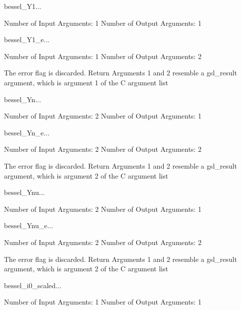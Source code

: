 \begin{funcdesc}{bessel_Y1}{...}

    Number of Input  Arguments:  1
    Number of Output Arguments:  1
\end{funcdesc}

\begin{funcdesc}{bessel_Y1_e}{...}

    Number of Input  Arguments:  1
    Number of Output Arguments:  2

The error flag is discarded.
Return Arguments 1 and 2 resemble a gsl_result argument,
	which is  argument 1 of the C argument list

\end{funcdesc}

\begin{funcdesc}{bessel_Yn}{...}

    Number of Input  Arguments:  2
    Number of Output Arguments:  1
\end{funcdesc}

\begin{funcdesc}{bessel_Yn_e}{...}

    Number of Input  Arguments:  2
    Number of Output Arguments:  2

The error flag is discarded.
Return Arguments 1 and 2 resemble a gsl_result argument,
	which is  argument 2 of the C argument list

\end{funcdesc}

\begin{funcdesc}{bessel_Ynu}{...}

    Number of Input  Arguments:  2
    Number of Output Arguments:  1
\end{funcdesc}

\begin{funcdesc}{bessel_Ynu_e}{...}

    Number of Input  Arguments:  2
    Number of Output Arguments:  2

The error flag is discarded.
Return Arguments 1 and 2 resemble a gsl_result argument,
	which is  argument 2 of the C argument list

\end{funcdesc}

\begin{funcdesc}{bessel_i0_scaled}{...}

    Number of Input  Arguments:  1
    Number of Output Arguments:  1
\end{funcdesc}

